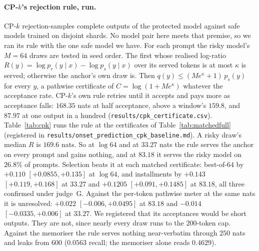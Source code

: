 \paragraph{CP-$k$'s rejection rule, run.}\label{app:cpk}
CP-$k$ \citep{vyas2023provable} rejection-samples complete outputs of the protected model against safe
models trained on disjoint shards. No model pair here meets that premise, so we ran its rule with the one
safe model we have. For each prompt the risky model's $M = 64$ draws are tested in seed order. The first
whose realised log-ratio $R(y) = \log p_r(y \mid x) - \log p_s(y \mid x)$ over its served tokens is at most
$\kappa$ is served; otherwise the anchor's own draw is. Then $q(y) \le (Me^{\kappa} + 1)\,p_s(y)$ for every
$y$, a pathwise certificate of $C = \log(1 + Me^{\kappa})$ whatever the acceptance rate. CP-$k$'s own rule
retries until it accepts and pays more as acceptance falls: $168.35$ nats at half acceptance, above a
window's $159.8$, and $87.97$ at one output in a hundred (\texttt{results/\allowbreak cpk\_\allowbreak certificate.csv}). Table~\ref{tab:cpk} runs the rule at the certificates of
Table~\ref{tab:matchedfull} (registered in \texttt{results/\allowbreak onset\_\allowbreak prediction\_\allowbreak cpk\_\allowbreak baseline.md}). A risky draw's median $R$ is $169.6$ nats. So at $\log 64$ and at $33.27$
nats the rule serves the anchor on every prompt and gains nothing, and at $83.18$ it serves the risky
model on $26.8\%$ of prompts. Selection beats it at each matched certificate: best-of-$64$ by $+0.110$
$[+0.0855, +0.135]$ at $\log 64$, and installments by $+0.143$ $[+0.119, +0.168]$ at $33.27$ and $+0.1205$
$[+0.091, +0.1485]$ at $83.18$, all three confirmed under judge~G. Against the per-token pathwise meter at
the same nats it is unresolved: $+0.022$ $[-0.006, +0.0495]$ at $83.18$ and $-0.014$ $[-0.0335, +0.006]$
at $33.27$. We registered that its acceptances would be short outputs. They are not, since nearly every
draw runs to the $200$-token cap. Against the memoriser the rule serves nothing near-verbatim through $250$
nats and leaks from $600$ ($0.0563$ recall; the memoriser alone reads $0.4629$).

